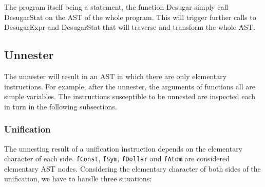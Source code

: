 \documentclass[a4paper]{memoir}
\begin{document}
The program itself being a statement, the function Desugar simply call DesugarStat on the AST of the whole program. This will trigger further calls to DesugarExpr and DesugarStat that will traverse and transform the whole AST.

\subsection{Unnester}\label{sec:arch:unnester}
The unnester will result in an AST in which there are only elementary instructions. For example, after the unnester, the arguments of functions all are simple variables. The instructions susceptible to be unnested are inspected each in turn in the following subsections.
\subsubsection{Unification}\label{sec:arch:unnester:unification}
The unnesting result of a unification instruction depends on the elementary
character of each side. \lstinline!fConst!, \lstinline!fSym!,
\lstinline!fDollar! and \lstinline!fAtom! are considered elementary AST nodes.
Considering the elementary character of both sides of the unification, we have to handle three situations:
\end{document}
